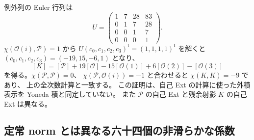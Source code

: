 \begin{remark}[数値的な独立検算と積について]
例外列の Euler 行列は
\[
 U=\begin{pmatrix}
 1&7&28&83\\0&1&7&28\\0&0&1&7\\0&0&0&1
 \end{pmatrix}.
\]
$\chi(\mathcal O(i),\mathcal P)=1$ から
$U(c_0,c_1,c_2,c_3)^{\mathsf t}=(1,1,1,1)^{\mathsf t}$ を解くと
$(c_0,c_1,c_2,c_3)=(-19,15,-6,1)$ となり、
\[
 [K]=[\mathcal P]+19[\mathcal O]-15[\mathcal O(1)]
                 +6[\mathcal O(2)]-[\mathcal O(3)]
\]
を得る。$\chi(\mathcal P,\mathcal P)=0$、
$\chi(\mathcal P,\mathcal O(i))=-1$ と合わせると $\chi(K,K)=-9$ であり、
上の全次数計算と一致する。
この証明は、自己 Ext の計算に使った外積表示を Yoneda 積と同定していない。
また $\mathcal P$ の自己 Ext と残余射影 $K$ の自己 Ext は異なる。
\end{remark}


\subsection{定常 norm とは異なる六十四個の非滑らかな係数}


